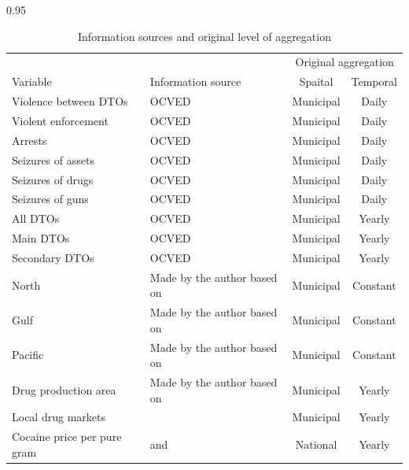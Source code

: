 \documentclass[12pt,letterpaper]{article}
\begin{document}
\begin{table}[h!]
\small
    \caption{Information sources and original level of aggregation}
    \label{tab:info_sources}
\begin{spacing}{0.95}
    \centering
    \begin{tabular}{p{4.5cm} p{6.5cm}cc}
    \hline
&	&  \multicolumn{2}{c}{Original aggregation}	 \\	 
Variable       	&	Information source	&	Spaital	&	Temporal	 \\	\hline
Violence between DTOs 	&	 OCVED \citep{Osorio2013b} 	&	Municipal	&	Daily	 \\	
Violent enforcement 	&	 OCVED \citep{Osorio2013b}	&	Municipal	&	Daily	 \\	
Arrests 	&	 OCVED \citep{Osorio2013b}	&	Municipal	&	Daily	 \\	
Seizures of assets  	&	 OCVED \citep{Osorio2013b}	&	Municipal	&	Daily	 \\	
Seizures of drugs 	&	 OCVED \citep{Osorio2013b}	&	Municipal	&	Daily	 \\	
Seizures of guns 	&	 OCVED \citep{Osorio2013b}	&	Municipal	&	Daily	 \\	
All DTOs	&	 OCVED \citep{Osorio2013b} 	&	Municipal	&	Yearly	 \\	
Main DTOs	&	 OCVED \citep{Osorio2013b}	&	Municipal	&	Yearly	 \\	
Secondary DTOs	&	 OCVED \citep{Osorio2013b}	&	Municipal	&	Yearly	 \\	
North	&	 Made by the author based on \citet{INEGI2011b} 	&	Municipal	&	Constant	 \\	
Gulf	&	 Made by the author based on \citet{INEGI2011b} 	&	Municipal	&	Constant	 \\	
Pacific	&	 Made by the author based on \citet{INEGI2011b} 	&	Municipal	&	Constant	 \\	
Drug production area	&	 Made by the author based on \citet{SecretariadelaDefensaNacional2011} 	&	Municipal	&	Yearly	 \\	
Local drug markets	&	 \citet{SecretariadeSalud2012} 	&	Municipal	&	Yearly	 \\	
Cocaine price per pure gram	&	 \citet{UnitedNationsOfficeonDrugsandCrime2014} and \citet{OfficeofNationalDrugControlPolicy2004}	&	National	&	Yearly	 \\	

\end{tabular}
\end{spacing}
\end{table}
\end{document}
